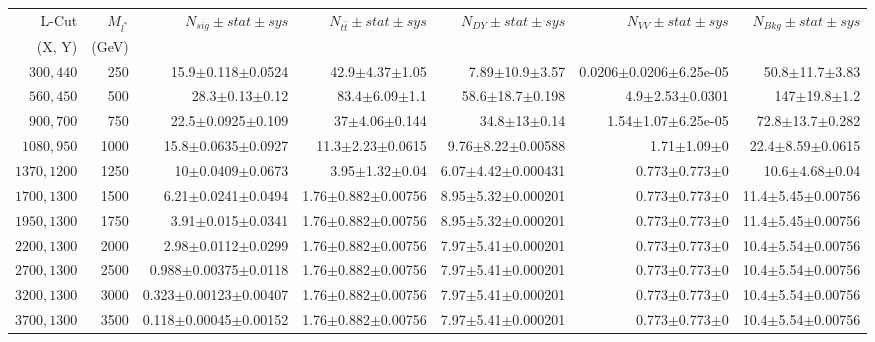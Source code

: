 \documentclass[]{article}
\begin{document}
\begin{table}
\begin{center}
\scriptsize{
\begin{tabular}{ |r|r|r|r|r|r|r|}
\hline 
L-Cut & $M_{l^*}$ & $N_{sig}\pm stat \pm sys $ &$N_{t\bar{t}}\pm stat \pm sys $ & $N_{DY}\pm stat \pm sys $ & $N_{VV}\pm stat \pm sys $ &$N_{Bkg}\pm stat \pm sys$\\
(X, Y) & (GeV) & && &&\\
\hline 
$300, 440$ & 250 & 15.9$\pm$0.118$\pm$0.0524 & 42.9$\pm$4.37$\pm$1.05 & 7.89$\pm$10.9$\pm$3.57 & 0.0206$\pm$0.0206$\pm$6.25e-05 & 50.8$\pm$11.7$\pm$3.83 \\
$560, 450$ & 500 & 28.3$\pm$0.13$\pm$0.12 & 83.4$\pm$6.09$\pm$1.1 & 58.6$\pm$18.7$\pm$0.198 & 4.9$\pm$2.53$\pm$0.0301 & 147$\pm$19.8$\pm$1.2 \\
$900, 700$ & 750 & 22.5$\pm$0.0925$\pm$0.109 & 37$\pm$4.06$\pm$0.144 & 34.8$\pm$13$\pm$0.14 & 1.54$\pm$1.07$\pm$6.25e-05 & 72.8$\pm$13.7$\pm$0.282 \\
$1080,950$ & 1000 & 15.8$\pm$0.0635$\pm$0.0927 & 11.3$\pm$2.23$\pm$0.0615 & 9.76$\pm$8.22$\pm$0.00588 & 1.71$\pm$1.09$\pm$0 & 22.4$\pm$8.59$\pm$0.0615 \\
$1370,1200$ & 1250 & 10$\pm$0.0409$\pm$0.0673 & 3.95$\pm$1.32$\pm$0.04 & 6.07$\pm$4.42$\pm$0.000431 & 0.773$\pm$0.773$\pm$0 & 10.6$\pm$4.68$\pm$0.04 \\
$1700,1300$ & 1500 & 6.21$\pm$0.0241$\pm$0.0494 & 1.76$\pm$0.882$\pm$0.00756 & 8.95$\pm$5.32$\pm$0.000201 & 0.773$\pm$0.773$\pm$0 & 11.4$\pm$5.45$\pm$0.00756 \\
$1950,1300$ & 1750 & 3.91$\pm$0.015$\pm$0.0341 & 1.76$\pm$0.882$\pm$0.00756 & 8.95$\pm$5.32$\pm$0.000201 & 0.773$\pm$0.773$\pm$0 & 11.4$\pm$5.45$\pm$0.00756 \\
$2200,1300$ & 2000 & 2.98$\pm$0.0112$\pm$0.0299 & 1.76$\pm$0.882$\pm$0.00756 & 7.97$\pm$5.41$\pm$0.000201 & 0.773$\pm$0.773$\pm$0 & 10.4$\pm$5.54$\pm$0.00756 \\
$2700,1300$ & 2500 & 0.988$\pm$0.00375$\pm$0.0118 & 1.76$\pm$0.882$\pm$0.00756 & 7.97$\pm$5.41$\pm$0.000201 & 0.773$\pm$0.773$\pm$0 & 10.4$\pm$5.54$\pm$0.00756 \\
$3200,1300$ & 3000 & 0.323$\pm$0.00123$\pm$0.00407 & 1.76$\pm$0.882$\pm$0.00756 & 7.97$\pm$5.41$\pm$0.000201 & 0.773$\pm$0.773$\pm$0 & 10.4$\pm$5.54$\pm$0.00756 \\
$3700,1300$ & 3500 & 0.118$\pm$0.00045$\pm$0.00152 & 1.76$\pm$0.882$\pm$0.00756 & 7.97$\pm$5.41$\pm$0.000201 & 0.773$\pm$0.773$\pm$0 & 10.4$\pm$5.54$\pm$0.00756 \\

\end{tabular}}
\end{center}
\end{table}
\end{document}
